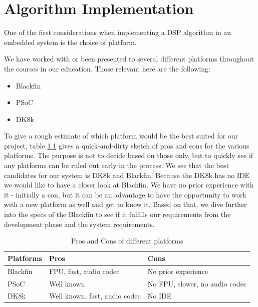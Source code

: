 \chapter{Algorithm Implementation}
One of the first considerations when implementing a DSP algorithm in an embedded system is the choice of platform. 

We have worked with or been presented to several different platforms throughout the courses in our education. Those relevant here are the following:

\begin{itemize}
\item Blackfin
\item PSoC
\item DK8k
\end{itemize}

To give a rough estimate of which platform would be the best suited for our project, table \ref{tab:proscons} gives a quick-and-dirty sketch of pros and cons for the various platforms. The purpose is not to decide based on those only, but to quickly see if any platforms can be ruled out early in the process.
We see that the best candidates for our system is DK8k and Blackfin. Because the DK8k has no IDE we would like to have a closer look at Blackfin. We have no prior experience with it - initially a con, but it can be an advantage to have the opportunity to work with a new platform as well and get to know it.
Based on that, we dive further into the specs of the Blackfin to see if it fulfills our requirements from the development phase and the system requirements.

\begin{table}[hbtp]
 \label{tab:proscons}
    \begin{tabular}{l|ll}
    Platforms & Pros                          & Cons                           \\ \hline
    Blackfin  & FPU, fast, audio codec        & No prior experience            \\
    PSoC      & Well known                   & No FPU, slower, no audio codec \\
    DK8k      & Well known, fast, audio codec & No IDE                         \\
    \end{tabular}
    \caption{Pros and Cons of different platforms}
\end{table}



